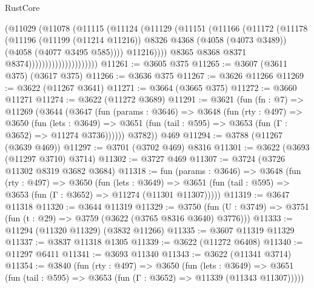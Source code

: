 \begin{lexlean}{RustCore}
\begin{coremodule}
                                      (@11029
                                        (@11078
                                          (@11115
                                            (@11124
                                              (@11129
                                                (@11151
                                                  (@11166
                                                    (@11172
                                                      (@11178
                                                        (@11196
                                                          (@11199 (@11214 @11216))
                                                          @8326
                                                          @4368
                                                          (@4058 (@4073 @3489))
                                                          (@4058 (@4077 @3495 @585))))
                                                      @11216))))
                                              @8365
                                              @8368
                                              @8371
                                              @8374)))))))))))))))))))))
@11261 := @3605 @375
@11265 := @3607 (@3611 @375) (@3617 @375)
@11266 := @3636 @375
@11267 := @3626 @11266
@11269 := @3622 (@11267 @3641)
@11271 := @3664 (@3665 @375)
@11272 := @3660 @11271
@11274 := @3622 (@11272 @3689)
@11291 := @3621
    (fun (fn : @7) =>
    @11269
      (@3644
        (@3647
          (fun (params : @3646) =>
          @3648
            (fun (rty : @497) =>
            @3650
              (fun (lets : @3649) =>
              @3651 (fun (tail : @595) => @3653 (fun (Γ : @3652) => @11274 @3736))))))
        @3782))
    @469
@11294 := @3788 (@11267 (@3639 @469))
@11297 := @3701 (@3702 @469) @8316
@11301 := @3622 (@3693 (@11297 @3710) @3714)
@11302 := @3727 @469
@11307 := @3724 (@3726 @11302 @8319 @3682 @3684)
@11318 := fun (params : @3646) =>
  @3648
    (fun (rty : @497) =>
    @3650
      (fun (lets : @3649) =>
      @3651 (fun (tail : @595) => @3653 (fun (Γ : @3652) => @11274 (@11301 @11307)))))
@11319 := @3647 @11318
@11320 := @3644 @11319
@11329 := @3750
    (fun (U : @3749) => @3751 (fun (t : @29) => @3759 (@3622 (@3765 @8316 @3640) @3776)))
@11333 := @11294 (@11320 @11329) (@3832 @11266)
@11335 := @3607 @11319 @11329
@11337 := @3837 @11318 @1305
@11339 := @3622 (@11272 @6408)
@11340 := @11297 @6411
@11341 := @3693 @11340
@11343 := @3622 (@11341 @3714)
@11354 := @3840
    (fun (rty : @497) =>
    @3650
      (fun (lets : @3649) =>
      @3651 (fun (tail : @595) => @3653 (fun (Γ : @3652) => @11339 (@11343 @11307)))))

\end{coremodule}
\end{lexlean}
